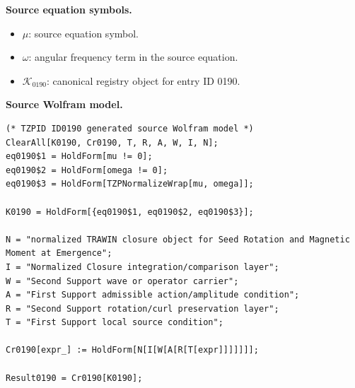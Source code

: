 \begin{minipage}[t]{0.49\linewidth}
\begingroup
\small
\raggedright
\textbf{Source equation symbols.}\par
\begin{itemize}[leftmargin=1.35em,itemsep=1pt,topsep=1pt,parsep=0pt]
    \item $\mu$: source equation symbol.
    \item $\omega$: angular frequency term in the source equation.
    \item $\mathcal{K}_{0190}$: canonical registry object for entry ID 0190.
\end{itemize}
\endgroup
\end{minipage}\hfill
\begin{minipage}[t]{0.47\linewidth}
\begingroup
\scriptsize
\raggedright
\textbf{Source Wolfram model.}\par
\begin{Verbatim}[fontsize=\tiny,breaklines=true,breakanywhere=true]
(* TZPID ID0190 generated source Wolfram model *)
ClearAll[K0190, Cr0190, T, R, A, W, I, N];
eq0190$1 = HoldForm[mu != 0];
eq0190$2 = HoldForm[omega != 0];
eq0190$3 = HoldForm[TZPNormalizeWrap[mu, omega]];

K0190 = HoldForm[{eq0190$1, eq0190$2, eq0190$3}];

N = "normalized TRAWIN closure object for Seed Rotation and Magnetic Moment at Emergence";
I = "Normalized Closure integration/comparison layer";
W = "Second Support wave or operator carrier";
A = "First Support admissible action/amplitude condition";
R = "Second Support rotation/curl preservation layer";
T = "First Support local source condition";

Cr0190[expr_] := HoldForm[N[I[W[A[R[T[expr]]]]]]];

Result0190 = Cr0190[K0190];
\end{Verbatim}
\endgroup
\end{minipage}

